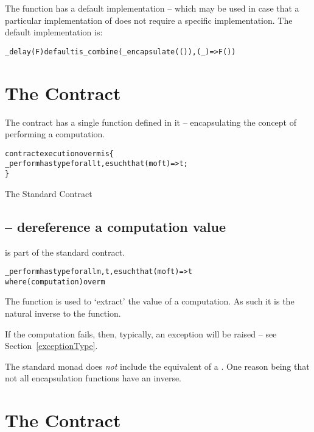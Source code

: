 The  function has a default implementation -- which may be used in case that a particular implementation of  does not require a specific implementation. The default implementation is:
\begin{alltt}
_delay(F) default is _combine(_encapsulate(()),(_) => F())
\end{alltt}

\section{The  Contract}
\label{execution}

The  contract has a single function defined in it -- encapsulating the concept of performing a computation.

\begin{program}
\begin{alltt}
contract execution over m is \{
  _perform has type for all t,e such that (m of t) => t;
\}
\end{alltt}
\caption{The Standard  Contract\label{executionContractProg}}
\end{program}

\subsection{ -- dereference a computation value}
\label{performFunction}
 is part of the standard  contract.
\begin{alltt}
\_perform has type for all m,t,e such that (m of t)=>t
                   where (computation) over m
\end{alltt}
The  function is used to `extract' the value of a computation. As such it is the natural inverse to the  function.

If the computation fails, then, typically, an exception will be raised -- see Section~\vref{exceptionType}.

\begin{aside}
The standard monad does \emph{not} include the equivalent of a . One reason being that not all encapsulation functions have an inverse.
\end{aside}

\section{The  Contract}
\label{injection}

